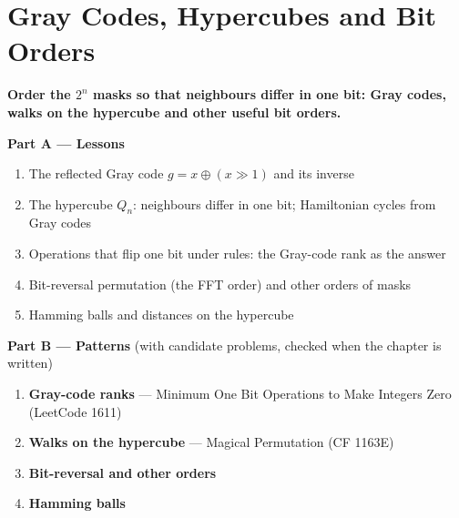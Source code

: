 \chapter{Gray Codes, Hypercubes and Bit Orders}
\label{ch:gray}

\begin{tcolorbox}[enhanced, colback=white, colframe=secondaryblue, boxrule=1pt, arc=2mm]
\textbf{\large\textcolor{primaryblue}{Order the $2^n$ masks so that neighbours differ in one bit: Gray codes, walks on the hypercube and other useful bit orders.}}
\end{tcolorbox}


\begin{plannedbox}
\textbf{Part A --- Lessons}
\begin{enumerate}[leftmargin=*, label=\textbf{A\arabic*.}, itemsep=1pt]
    \item The reflected Gray code $g = x \oplus (x \gg 1)$ and its inverse
    \item The hypercube $Q_n$: neighbours differ in one bit; Hamiltonian cycles from Gray codes
    \item Operations that flip one bit under rules: the Gray-code rank as the answer
    \item Bit-reversal permutation (the FFT order) and other orders of masks
    \item Hamming balls and distances on the hypercube
\end{enumerate}
\textbf{Part B --- Patterns} (with candidate problems, checked when the chapter is written)
\begin{enumerate}[leftmargin=*, label=\textbf{P\arabic*.}, itemsep=1pt]
    \item \textbf{Gray-code ranks} --- Minimum One Bit Operations to Make Integers Zero {\small\color{darkgray}(LeetCode 1611)}
    \item \textbf{Walks on the hypercube} --- Magical Permutation {\small\color{darkgray}(CF 1163E)}
    \item \textbf{Bit-reversal and other orders}
    \item \textbf{Hamming balls}
\end{enumerate}
\end{plannedbox}

